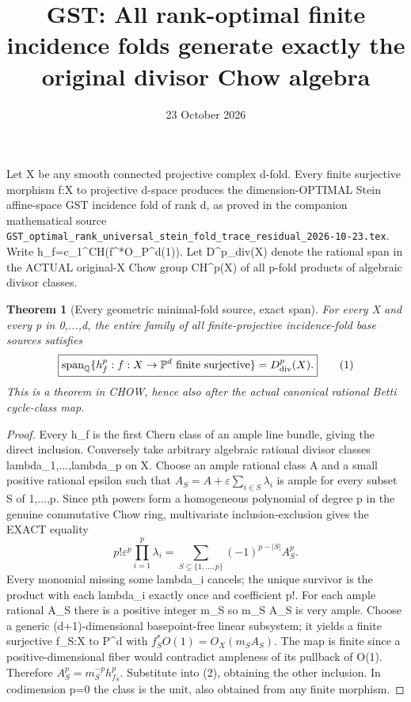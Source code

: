 \documentclass[11pt]{article}
\title{GST: All rank-optimal finite incidence folds generate exactly the original divisor Chow algebra}
\date{23 October 2026}
\newtheorem{theorem}{Theorem}
\begin{document}
\maketitle
Let X be any smooth connected projective complex d-fold.
Every finite surjective morphism f:X to projective d-space
produces the dimension-OPTIMAL Stein affine-space GST
incidence fold of rank d, as proved in the companion
mathematical source
\texttt{GST\_optimal\_rank\_universal\_stein\_fold\_trace\_residual\_2026-10-23.tex}.
Write h_f=c_1^{CH}(f^*O_{\mathbb P^d}(1)).
Let D^p_{\rm div}(X) denote the rational span in the
ACTUAL original-X Chow group CH^p(X) of all p-fold
products of algebraic divisor classes.

\begin{theorem}[Every geometric minimal-fold source, exact span]
For every X and every p in 0,...,d, the entire family of
all finite-projective incidence-fold base sources satisfies
\[
 \boxed{\operatorname{span}_{\mathbb Q}
 \{h_f^p:f:X\to\mathbb P^d\text{ finite surjective}\}
 =D^p_{\rm div}(X).}                                     \tag{1}
\]
This is a theorem in CHOW, hence also after the actual
canonical rational Betti cycle-class map.
\end{theorem}
\begin{proof}
Every h_f is the first Chern class of an ample
line bundle, giving the direct inclusion.
Conversely take arbitrary algebraic rational
divisor classes lambda_1,...,lambda_p on X.
Choose an ample rational class A and a small positive
rational epsilon such that
$A_S=A+\varepsilon\sum_{i\in S}\lambda_i$
is ample for every subset S of {1,...,p}.
Since pth powers form a homogeneous polynomial
of degree p in the genuine commutative Chow ring,
multivariate inclusion-exclusion gives the EXACT equality
\[
 \boxed{p!\varepsilon^p\prod_{i=1}^{p}\lambda_i
  =\sum_{S\subseteq\{1,\ldots,p\}}
       (-1)^{p-|S|}A_S^p.}                                \tag{2}
\]
Every monomial missing some lambda_i cancels;
the unique survivor is the product with each
lambda_i exactly once and coefficient p!.
For each ample rational A_S there is a positive
integer m_S so m_S A_S is very ample.
Choose a generic (d+1)-dimensional
basepoint-free linear subsystem; it yields a
finite surjective f_S:X to P^d with
$f_S^*O(1)=O_X(m_S A_S)$.
The map is finite since a positive-dimensional
fiber would contradict ampleness of its
pullback of O(1). Therefore
$A_S^p=m_S^{-p}h_{f_S}^p$.
Substitute into (2), obtaining the other inclusion.
In codimension p=0 the class is the unit, also
obtained from any finite morphism.
\end{proof}
\end{document}
